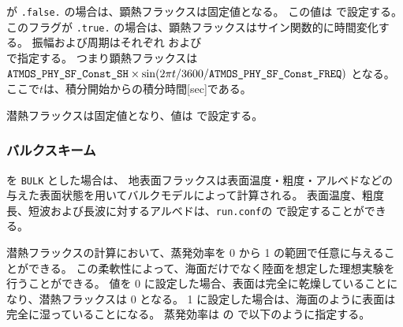  が \verb|.false.| の場合は、顕熱フラックスは固定値となる。
この値は  で設定する。
このフラグが \verb|.true.| の場合は、顕熱フラックスはサイン関数的に時間変化する。
振幅および周期はそれぞれ  および \\  で指定する。
つまり顕熱フラックスは \\
$\nmitemeq{ATMOS_PHY_SF_Const_SH} \times \sin(2\pi t/3600/\nmitemeq{ATMOS_PHY_SF_Const_FREQ})$ となる。
ここで$t$は、積分開始からの積分時間[sec]である。

潜熱フラックスは固定値となり、値は  で設定する。


\subsubsection{バルクスキーム}
 を \verb|BULK| とした場合は、
地表面フラックスは表面温度・粗度・アルベドなどの与えた表面状態を用いてバルクモデルによって計算される。
表面温度、粗度長、短波および長波に対するアルベドは、\verb|run.conf|の で設定することができる。
%


潜熱フラックスの計算において、蒸発効率を 0 から 1 の範囲で任意に与えることができる。
この柔軟性によって、海面だけでなく陸面を想定した理想実験を行うことができる。
値を 0 に設定した場合、表面は完全に乾燥していることになり、潜熱フラックスは 0 となる。
1 に設定した場合は、海面のように表面は完全に湿っていることになる。
蒸発効率は  の  で以下のように指定する。
%



